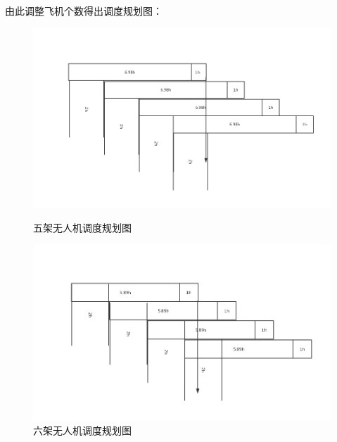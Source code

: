 \documentclass{whutmod}
\begin{document}
	由此调整飞机个数得出调度规划图：
	\begin{figure}[H]
		\begin{minipage}[t]{0.5\linewidth}
		\centering
		\includegraphics[width=\textwidth]{figures/5j.png}
		\caption{五架无人机调度规划图}\label{5j}
		\end{minipage}
		\hfill%
		\begin{minipage}[t]{0.5\linewidth}
		\centering
		\includegraphics[width=\textwidth]{figures/6j.png}
		\caption{六架无人机调度规划图}\label{6j}
		\end{minipage}
	\end{figure}
\end{document}

